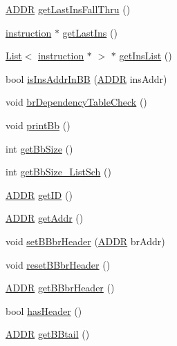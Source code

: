 \begin{DoxyCompactItemize}
\item 
\hyperlink{binaryTranslator_2global_8h_a8bb6b77b3aab51e3a8d1866dd5861225}{ADDR} \hyperlink{classbasicblock_afe5fbc2aaf3764ecffed166a014a9016}{getLastInsFallThru} ()
\item 
\hyperlink{classinstruction}{instruction} $\ast$ \hyperlink{classbasicblock_a99fb16d14456bb07b0033a0489ced872}{getLastIns} ()
\item 
\hyperlink{classList}{List}$<$ \hyperlink{classinstruction}{instruction} $\ast$ $>$ $\ast$ \hyperlink{classbasicblock_adc40d816c82feedc1f7027fc29470d90}{getInsList} ()
\item 
bool \hyperlink{classbasicblock_afd299af5d08655c4fbd10221f5edb556}{isInsAddrInBB} (\hyperlink{binaryTranslator_2global_8h_a8bb6b77b3aab51e3a8d1866dd5861225}{ADDR} insAddr)
\item 
void \hyperlink{classbasicblock_ab7adcaad4e1c148578c9ee7c419ebabc}{brDependencyTableCheck} ()
\item 
void \hyperlink{classbasicblock_a1599003c14b63f443c1ca3c48c34238e}{printBb} ()
\item 
int \hyperlink{classbasicblock_a42862e82af55ea72dc2e69ad32f3df29}{getBbSize} ()
\item 
int \hyperlink{classbasicblock_a17c89777dbbfb909e6749330569066fc}{getBbSize\_\-ListSch} ()
\item 
\hyperlink{binaryTranslator_2global_8h_a8bb6b77b3aab51e3a8d1866dd5861225}{ADDR} \hyperlink{classbasicblock_aff434c369968fe5fb3151d8ec00665b4}{getID} ()
\item 
\hyperlink{binaryTranslator_2global_8h_a8bb6b77b3aab51e3a8d1866dd5861225}{ADDR} \hyperlink{classbasicblock_a71eb42838e461e58085faf79e8cf1607}{getAddr} ()
\item 
void \hyperlink{classbasicblock_a08a435779d5c69e560f81d76511033f8}{setBBbrHeader} (\hyperlink{binaryTranslator_2global_8h_a8bb6b77b3aab51e3a8d1866dd5861225}{ADDR} brAddr)
\item 
void \hyperlink{classbasicblock_a75c5a313363a9d2ad89133d3fa9c9b2d}{resetBBbrHeader} ()
\item 
\hyperlink{binaryTranslator_2global_8h_a8bb6b77b3aab51e3a8d1866dd5861225}{ADDR} \hyperlink{classbasicblock_aba106088c0783baf1a57018bbc091fe1}{getBBbrHeader} ()
\item 
bool \hyperlink{classbasicblock_af49545fcc35042634fa48f78ca9f55cb}{hasHeader} ()
\item 
\hyperlink{binaryTranslator_2global_8h_a8bb6b77b3aab51e3a8d1866dd5861225}{ADDR} \hyperlink{classbasicblock_adb0ccbb0bd5d36fd05fbeb80b2e47494}{getBBtail} ()

\end{DoxyCompactItemize}
